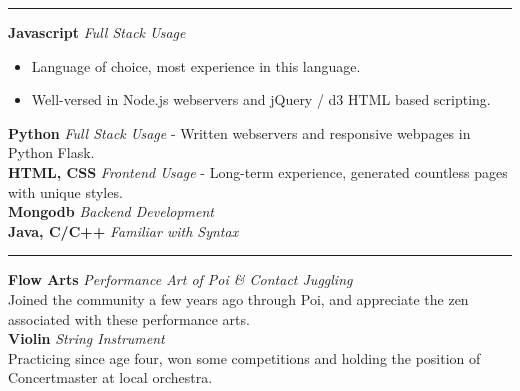 \documentclass[14, .75in]{article}
\begin{document}
  \vspace{0.1cm} \hrule \vspace{0.3cm}
  \noindent
  \textbf{Javascript} \textit{Full Stack Usage}
  \begin{itemize}[label={--},noitemsep, topsep=0pt]
    \item Language of choice, most experience in this language.
    \item Well-versed in Node.js webservers and jQuery / d3 HTML based scripting.
  \end{itemize}
  \textbf{Python}\textit{ Full Stack Usage}
    - Written webservers and responsive webpages in Python Flask.\\
  \textbf{HTML, CSS} \textit{ Frontend Usage}
    - Long-term experience, generated countless pages with unique styles.\\
  \textbf{Mongodb}\textit{ Backend Development}\\
  \textbf{ Java, C/C++} \textit{ Familiar with Syntax}\\

  \vspace{0.1cm} \hrule \vspace{0.3cm}
  \noindent\textbf{Flow Arts}\textit{ Performance Art of Poi \& Contact Juggling}\\
  Joined the community a few years ago through Poi, and appreciate the zen associated with these performance arts.\\
  \textbf{Violin}\textit{ String Instrument}\\
  Practicing since age four, won some competitions and holding the position of Concertmaster at local orchestra.
\end{document}
